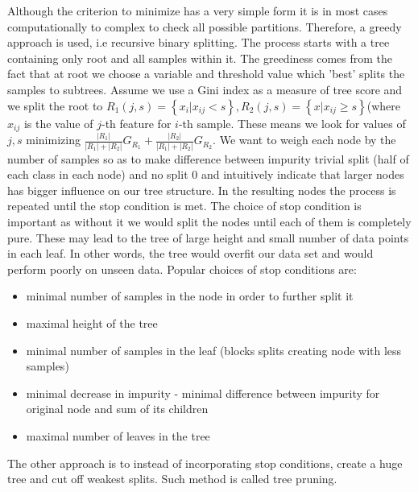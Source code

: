 \documentclass[12pt, wide]{mwart}
\begin{document}
Although the criterion to minimize has a very simple form it is in most cases computationally to complex to check all possible partitions. Therefore, a greedy approach is used, i.e recursive binary splitting. The process starts with a tree containing only root and all samples within it. The greediness comes from the fact that at root we choose a variable and threshold value which 'best' splits the samples to subtrees. Assume we use a Gini index as a measure of tree score and we split the root to $R_1(j, s) = \left\{x_i| x_{ij} < s \right\}, R_2(j, s) = \left\{x| x_{ij} \geq s \right\}$(where $x_{ij}$ is the value of $j$-th feature for $i$-th sample. These means we look for values of $j,s$ minimizing $\frac{|R_1|}{|R_1|+|R_2|}G_{R_1} + \frac{|R_2|}{|R_1|+|R_2|}G_{R_2}$. We want to weigh each node by the number of samples so as to make difference between impurity trivial split (half of each class in each node) and no split $0$ and intuitively indicate that larger nodes has bigger influence on our tree structure. In the resulting nodes the process is repeated until the stop condition is met. The choice of stop condition is important as without it we would split the nodes until each of them is completely pure. These may lead to the tree of large height and small number of data points in each leaf. In other words, the tree would overfit our data set and would perform poorly on unseen data. Popular choices of stop conditions are:
\begin{itemize}
    \item minimal number of samples in the node in order to further split it
    \item maximal height of the tree
    \item minimal number of samples in the leaf (blocks splits creating node with less samples)
    \item minimal decrease in impurity - minimal difference between impurity for original node and sum of its children
    \item maximal number of leaves in the tree
\end{itemize}

The other approach is to instead of incorporating stop conditions, create a huge tree and cut off weakest splits. Such method is called tree pruning. 
\end{document}
